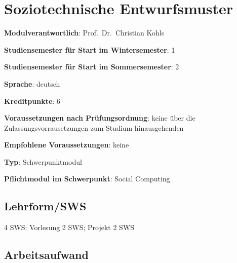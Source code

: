 \chapter{Soziotechnische
Entwurfsmuster\label{/mi-2017/modulbeschreibungen-master/MA_SC_Soziotechnische_Entwurfsmuster}}\label{soziotechnische-entwurfsmusterpathlabelmi-2017modulbeschreibungen-mastermaux5fscux5fsoziotechnischeux5fentwurfsmuster}

\begin{modulHead}
\textbf{Modulverantwortlich}: Prof.~Dr.~Christian
Kohls
\end{modulHead}
\begin{modulHead}
\textbf{Studiensemester für
Start im Wintersemester}:
1
\end{modulHead}
\begin{modulHead}
\textbf{Studiensemester für Start
im Sommersemester}:
2
\end{modulHead}
\begin{modulHead}
\textbf{Sprache}:
deutsch
\end{modulHead}
\begin{modulHead}
\textbf{Kreditpunkte}:
6
\end{modulHead}
\begin{modulHead}
\textbf{Voraussetzungen nach
Prüfungsordnung}: keine über die Zulassungsvorrausetzungen zum Studium
hinausgehenden
\end{modulHead}
\begin{modulHead}
\textbf{Empfohlene
Voraussetzungen}: keine
\end{modulHead}
\begin{modulHead}
\textbf{Typ}:
Schwerpunktmodul
\end{modulHead}
\begin{modulHead}
\textbf{Pflichtmodul
im Schwerpunkt}: Social Computing
\end{modulHead}


\section*{Lehrform/SWS\label{/mi-2017/modulbeschreibungen-master/MA_SC_Soziotechnische_Entwurfsmuster}}\label{lehrformswspathlabelmi-2017modulbeschreibungen-mastermaux5fscux5fsoziotechnischeux5fentwurfsmuster}

4 SWS: Vorlesung 2 SWS; Projekt 2 SWS

\section*{Arbeitsaufwand\label{/mi-2017/modulbeschreibungen-master/MA_SC_Soziotechnische_Entwurfsmuster}}\label{arbeitsaufwandpathlabelmi-2017modulbeschreibungen-mastermaux5fscux5fsoziotechnischeux5fentwurfsmuster}

